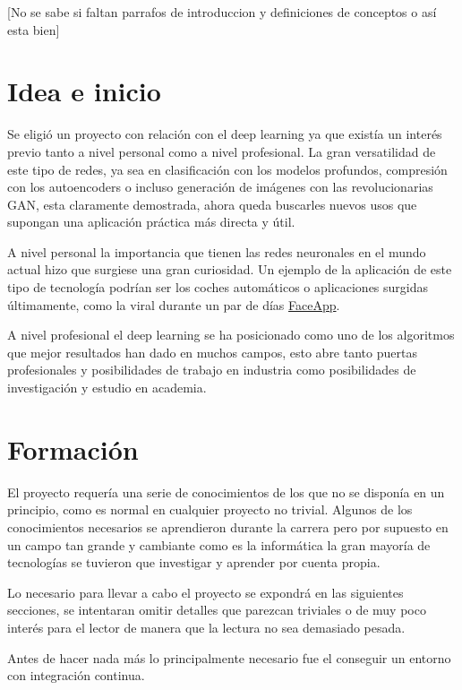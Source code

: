 
[No se sabe si faltan parrafos de introduccion y definiciones de conceptos o así esta bien]


\section{Idea e inicio}

Se eligió un proyecto con relación con el deep learning ya que existía un interés previo tanto a nivel personal como a nivel profesional. La gran versatilidad de este tipo de redes, ya sea en clasificación con los modelos profundos, compresión con los autoencoders o incluso generación de imágenes con las revolucionarias GAN, esta claramente demostrada, ahora queda buscarles nuevos usos que supongan una aplicación práctica más directa y útil. 

A nivel personal la importancia que tienen las redes neuronales en el mundo actual hizo que surgiese una gran curiosidad. Un ejemplo de la aplicación de este tipo de tecnología podrían ser los coches automáticos o aplicaciones surgidas últimamente, como la viral durante un par de días \href{https://www.faceapp.com/}{FaceApp}. 

A nivel profesional el deep learning se ha posicionado como uno de los algoritmos que mejor resultados han dado en muchos campos, esto abre tanto puertas profesionales y posibilidades de trabajo en industria como posibilidades de investigación y estudio en academia. 



\section{Formación}
El proyecto requería una serie de conocimientos de los que no se disponía en un principio, como es normal en cualquier proyecto no trivial. Algunos de los conocimientos necesarios se aprendieron durante la carrera pero por supuesto en un campo tan grande y cambiante como es la informática la gran mayoría de tecnologías se tuvieron que investigar y aprender por cuenta propia.

Lo necesario para llevar a cabo el proyecto se expondrá en las siguientes secciones, se intentaran omitir detalles que parezcan triviales o de muy poco interés para el lector de manera que la lectura no sea demasiado pesada.

Antes de hacer nada más lo principalmente necesario fue el conseguir un entorno con integración continua. 

